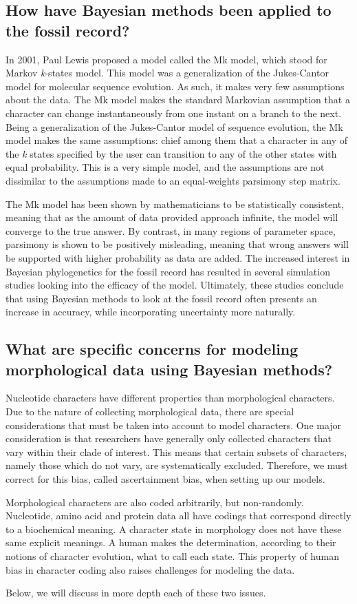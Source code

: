 \documentclass[]{article}
\begin{document}
	\subsection{How have Bayesian methods been applied to the fossil record?}
	In 2001, Paul Lewis proposed a model called the Mk model, which stood for Markov \textit{k}-states model.
	This model was a generalization of the Jukes-Cantor model for molecular sequence evolution.
	As such, it makes  very few assumptions about the data.
	The Mk model makes the standard Markovian assumption that a character can change instantaneously from one instant on a branch to the next.
	Being a generalization of the Jukes-Cantor model of sequence evolution, the Mk model makes the same assumptions: chief among them that a character in any of the \textit{k} states specified by the user can transition to any of the other states with equal probability.
	This is a very simple model, and the assumptions are not dissimilar to the assumptions made to an equal-weights parsimony step matrix. \par
	The Mk model has been shown by mathematicians to be statistically consistent, meaning that as the amount of data provided approach infinite, the model will converge to the true answer.
	By contrast, in many regions of parameter space, parsimony is shown to be positively misleading, meaning that wrong answers will be supported with higher probability as data are added.
	The increased interest in Bayesian phylogenetics for the fossil record has resulted in several simulation studies looking into the efficacy of the model.
	Ultimately, these studies conclude that using Bayesian methods to look at the fossil record often presents an increase in accuracy, while incorporating uncertainty more naturally. \par	
	
	\subsection{What are specific concerns for modeling morphological data using Bayesian methods?}
	Nucleotide characters have different properties than morphological characters.
	Due to the nature of collecting morphological data, there are special considerations that must be taken into account to model characters.
	One major consideration is that researchers have generally only collected characters that vary within their clade of interest.
	This means that certain subsets of characters, namely those which do not vary, are systematically excluded. 
	Therefore, we must correct for this bias, called ascertainment bias, when setting up our models. \par
	Morphological characters are also coded arbitrarily, but non-randomly.
	Nucleotide, amino acid and protein data all have codings that correspond directly to a biochemical meaning.
	A character state in morphology does not have these same explicit meanings.
	A human makes the determination, according to their notions of character evolution, what to call each state.
	This property of human bias in character coding also raises challenges for modeling the data. \par
	Below, we will discuss in more depth each of these two issues.
\end{document}
